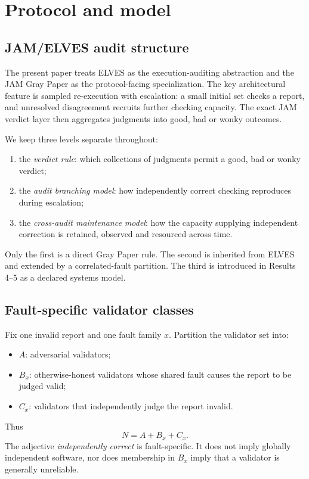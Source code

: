 \section{Protocol and model}
\label{sec:model}

\subsection{JAM/ELVES audit structure}

The present paper treats ELVES as the execution-auditing abstraction and the JAM Gray Paper as the protocol-facing specialization. The key architectural feature is sampled re-execution with escalation: a small initial set checks a report, and unresolved disagreement recruits further checking capacity. The exact JAM verdict layer then aggregates judgments into good, bad or wonky outcomes.

We keep three levels separate throughout:
\begin{enumerate}[leftmargin=*]
\item the \emph{verdict rule}: which collections of judgments permit a good, bad or wonky verdict;
\item the \emph{audit branching model}: how independently correct checking reproduces during escalation;
\item the \emph{cross-audit maintenance model}: how the capacity supplying independent correction is retained, observed and resourced across time.
\end{enumerate}

Only the first is a direct Gray Paper rule. The second is inherited from ELVES and extended by a correlated-fault partition. The third is introduced in Results 4--5 as a declared systems model.

\subsection{Fault-specific validator classes}

Fix one invalid report and one fault family $x$. Partition the validator set into:
\begin{itemize}
\item $A$: adversarial validators;
\item $B_x$: otherwise-honest validators whose shared fault causes the report to be judged valid;
\item $C_x$: validators that independently judge the report invalid.
\end{itemize}
Thus
\[
N=A+B_x+C_x.
\]
The adjective \emph{independently correct} is fault-specific. It does not imply globally independent software, nor does membership in $B_x$ imply that a validator is generally unreliable.

